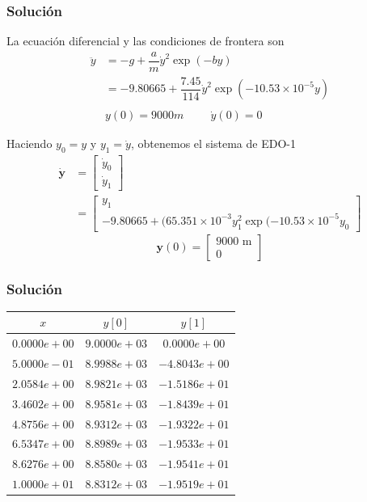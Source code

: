 \begin{frame}
\frametitle{Solución}
La ecuación diferencial y las condiciones de frontera son
\[ \begin{split}
\ddot{y} &= - g + \dfrac{a}{m} \dot{y}^{2} \exp(-by) \\
&= -9.80665 + \dfrac{7.45}{114} \dot{y}^{2} \exp(-10.53 \times 10^{-5}y) \\
{} \\
&{} y(0) = 9000 m \hspace{1cm} \dot{y}(0)=0
\end{split} \]
\end{frame}
\begin{frame}
Haciendo $y_{0}= y$ y $y_{1}=\dot{y}$, obtenemos el sistema de EDO-1
\fontsize{12}{12}\selectfont
\[ \begin{split}
\mathbf{\dot{y}} &= \begin{bmatrix}
\dot{y}_{0} \\
\dot{y}_{1}
\end{bmatrix} \\
&= \begin{bmatrix}
y_{1} \\
-9.80665 + (65.351 \times 10^{-3} y_{1}^{2} \exp(-10.53 \times 10^{-5} y_{0}
\end{bmatrix}
\end{split} \]
\[ \mathbf{y}(0) = 
\begin{bmatrix}
9000 \mbox{ m} \\
0
\end{bmatrix} \]
\end{frame}
\begin{frame}
\frametitle{Solución}
\begin{tabular}{c | c | c}
$x$ & $y[0]$ & $y[1]$ \\ \hline
$0.0000e+00$ & $9.0000e+03$ & $0.0000e+00$ \\ \hline
$5.0000e-01$ & $8.9988e+03$ & $-4.8043e+00$ \\ \hline
$2.0584e+00$ & $8.9821e+03$ & $-1.5186e+01$ \\ \hline
$3.4602e+00$ & $8.9581e+03$ & $-1.8439e+01$ \\ \hline
$4.8756e+00$ & $8.9312e+03$ & $-1.9322e+01$ \\ \hline
$6.5347e+00$ & $8.8989e+03$ & $-1.9533e+01$ \\ \hline
$8.6276e+00$ & $8.8580e+03$ & $-1.9541e+01$ \\ \hline
$1.0000e+01$ & $8.8312e+03$ & $-1.9519e+01$ \\ \hline
\end{tabular}
\end{frame}

